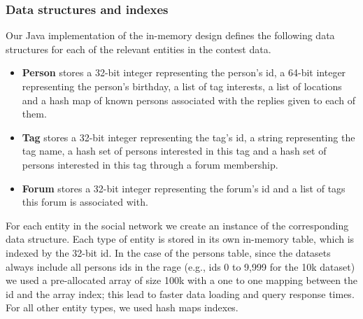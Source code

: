 \documentclass{article}
\begin{document}





\subsubsection{Data structures and indexes}
Our Java implementation of the in-memory design defines the following
data structures for each of the relevant entities in the contest data.

\begin{itemize}
\item \textbf{Person} stores a 32-bit integer representing the person's id, a 64-bit integer representing the person's birthday, a list of tag interests, a list of locations and a hash map of known persons associated with the replies given to each of them.
\item \textbf{Tag} stores a 32-bit integer representing the tag's id, a string representing the tag name, a hash set of persons interested in this tag and a hash set of persons interested in this tag through a forum membership. 
\item \textbf{Forum} stores a 32-bit integer representing the forum's id and a list of tags this forum is associated with.
\end{itemize}

For each entity in the social network we create an instance of the corresponding data structure. Each type of entity is stored in its own in-memory table, which is indexed by the 32-bit id. In the case of the persons table, since the datasets always include all persons ids in the rage (e.g., ids 0 to 9,999 for the 10k dataset) we used a pre-allocated array of size 100k with a one to one mapping between the id and the array index; this lead to faster data loading and query response times. For all other entity types, we used hash maps indexes. 
\end{document}
